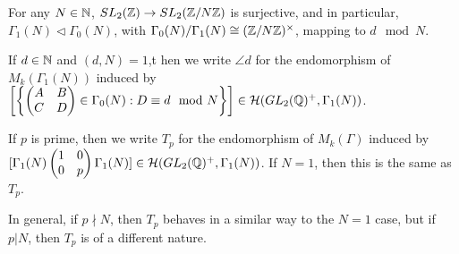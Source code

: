\documentclass[10pt,a4paper]{article}
\begin{document}
For any $N \in \mathbb{N}$, $SL_2(\mathbb{Z}) \to SL_2(\mathbb{Z}/N\mathbb{Z})$ is surjective, and in particular, $\Gamma_1(N) \triangleleft \Gamma_0(N)$, with $\Gamma_0(N)/\Gamma_1(N) \cong (\mathbb{Z}/N\mathbb{Z})^\times$, mapping to $d \mod N$.

If $d \in \mathbb{N}$ and $(d, N) = 1$,t hen we write $\angle{d}$ for the endomorphism of $M_k(\Gamma_1(N))$ induced by $\left[\left\{\begin{pmatrix}A&B\\C&D\end{pmatrix} \in \Gamma_0(N) : D \equiv d \mod N\right\}\right] \in \mathcal{H}(GL_2(\mathbb{Q})^+, \Gamma_1(N))$.

If $p$ is prime, then we write $T_p$ for the endomorphism of $M_k(\Gamma)$ induced by $[\Gamma_1(N) \begin{pmatrix}1&0\\0&p \end{pmatrix}\Gamma_1(N)] \in \mathcal{H}(GL_2(\mathbb{Q})^+, \Gamma_1(N))$. If $N = 1$, then this is the same as $T_p$.

In general, if $p \nmid N$, then $T_p$ behaves in a similar way to the $N=1$ case, but if $p |N$, then $T_p$ is of a different nature.
\end{document}
